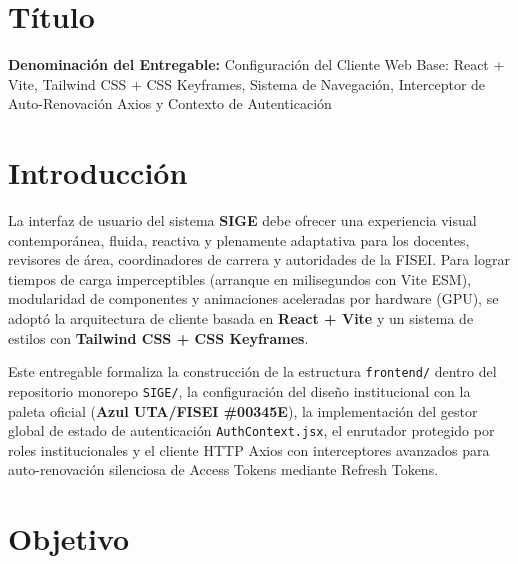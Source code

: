 \documentclass[12pt,a4paper]{article}
\begin{document}

\vspace{0.25cm}
\section{Título}
\textbf{Denominación del Entregable:} Configuración del Cliente Web Base: React + Vite, Tailwind CSS + CSS Keyframes, Sistema de Navegación, Interceptor de Auto-Renovación Axios y Contexto de Autenticación



\section{Introducción}
La interfaz de usuario del sistema \textbf{SIGE} debe ofrecer una experiencia visual contemporánea, fluida, reactiva y plenamente adaptativa para los docentes, revisores de área, coordinadores de carrera y autoridades de la FISEI. Para lograr tiempos de carga imperceptibles (arranque en milisegundos con Vite ESM), modularidad de componentes y animaciones aceleradas por hardware (GPU), se adoptó la arquitectura de cliente basada en \textbf{React + Vite} y un sistema de estilos con \textbf{Tailwind CSS + CSS Keyframes}.

Este entregable formaliza la construcción de la estructura \texttt{frontend/} dentro del repositorio monorepo \texttt{SIGE/}, la configuración del diseño institucional con la paleta oficial (\textbf{Azul UTA/FISEI \#00345E}), la implementación del gestor global de estado de autenticación \texttt{AuthContext.jsx}, el enrutador protegido por roles institucionales y el cliente HTTP Axios con interceptores avanzados para auto-renovación silenciosa de Access Tokens mediante Refresh Tokens.

\section{Objetivo}
\end{document}
